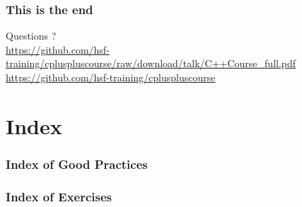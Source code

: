 \documentclass[compress]{beamer}
\begin{document}
\begin{frame}
  \frametitle{This is the end}
  \begin{center}
    \Huge Questions ?\\
    \vspace{.5cm}
    \tiny \url{https://github.com/hsf-training/cpluspluscourse/raw/download/talk/C++Course\_full.pdf}\\
    \tiny \url{https://github.com/hsf-training/cpluspluscourse}
  \end{center}
\end{frame}

\section*{Index}

\begin{frame}
  \frametitle{Index of Good Practices}
  \listofgoodpractices
\end{frame}

\begin{frame}
  \frametitle{Index of Exercises}
  \listofexercises
\end{frame}
\end{document}
